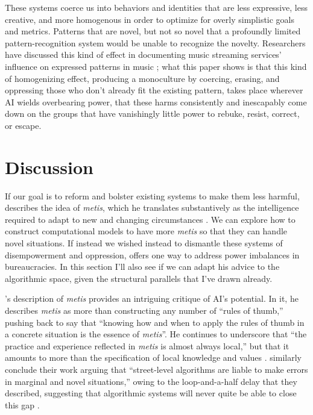 \documentclass[manuscript,screen]{acmart}
\begin{document}
These systems coerce us into behaviors and identities that are less expressive, less creative, and more homogenous in order to optimize for overly simplistic goals and metrics.
Patterns that are novel, but not so novel that a profoundly limited pattern-recognition system would be unable to recognize the novelty.
Researchers have discussed this kind of effect in documenting music streaming services' influence on expressed patterns in music
\cite{spotifyLengths};
what this paper shows is that this kind of homogenizing effect, producing a monoculture by coercing, erasing, and oppressing those who don't already fit the existing pattern, takes place wherever AI wields overbearing power, that these harms consistently and inescapably come down on the groups that have vanishingly little power to rebuke, resist, correct, or escape.

\section{Discussion}

If our goal is to reform and bolster existing systems to make them less harmful, \citeauthor{scott1998seeing} describes the idea of \emph{metis}, which he translates substantively as the intelligence required to adapt to new and changing circumstances
\cite{scott1998seeing}.
We can explore how to construct computational models to have more \emph{metis} so that they can handle novel situations.
If instead we wished instead to dismantle these systems of disempowerment and oppression, \citeauthor{graeber2015utopia} offers one way to address power imbalances in bureaucracies.
In this section I'll also see if we can adapt his advice to the algorithmic space, given the structural parallels that I've drawn already.

\citeauthor{scott1998seeing}'s description of \emph{metis} provides an intriguing critique of AI's potential.
In it, he describes \emph{metis} as more than constructing any number of ``rules of thumb,'' pushing back to say that ``knowing how and when to apply the rules of thumb in a concrete situation is the essence of \emph{metis}''.
He continues to underscore that ``the practice and experience reflected in \emph{metis} is almost always local,'' but that it amounts to more than the specification of local knowledge and values
\cite{scott1998seeing}.
\citeauthor{streetLevelAlgorithms} similarly conclude their work arguing that ``street-level algorithms are liable to make errors in marginal and novel situations,'' owing to the loop-and-a-half delay that they described, suggesting that algorithmic systems will never quite be able to close this gap
\cite{streetLevelAlgorithms}.
\end{document}
